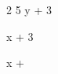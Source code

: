 \newcommand{\abc}{5}
\newcommand{\xyz}[2][x]{%
#1 + #2%
}
\renewcommand{%
\phi%
}{%
\theta%
}
\newcommand{\aaa}{\b{2}}
\renewcommand{\phi}{\aaa}
\newcommand{\b}[1]{#1}

\phi
\abc
\xyz[y] {3}
\xyz 3
\xyz \alpha
